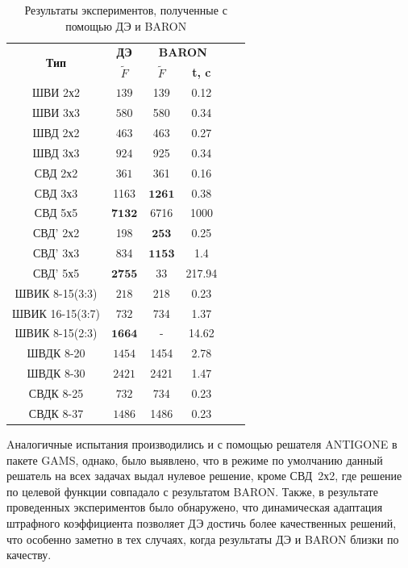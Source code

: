 \begin{table}[!h]

\centering
\caption{ Результаты экспериментов, полученные с помощью ДЭ и BARON}
\begin{tabular}{|c|c|c c|c c|}
    \hline
    \multirow{2}{*}{\textbf{Тип}} & \textbf{ДЭ} & \multicolumn{2}{|c|}{\textbf{BARON}} \\
    & \textbf{$\tilde{F}$} & \textbf{$\tilde{F}$} & \textbf{t, c}  \\
    \hline
    ШВИ 2х2         & ${139}$   & 139    & 0.12      \\
    ШВИ 3х3         & ${580}$   & 580    & 0.34       \\
    ШВД 2х2         & ${463}$   & 463    & 0.27     \\
    ШВД 3х3         & ${924}$   & 925    & 0.34        \\
    СВД 2х2         & ${361}$   & 361    & 0.16         \\
    СВД 3х3        & 1163  & $\mathbf{1261}$   & 0.38     \\
    СВД 5х5         & $\mathbf{7132}$  & 6716   & 1000   \\
    СВД' 2х2       & 198   & $\mathbf{253}$    & 0.25         \\
    СВД' 3х3       & 834   & $\mathbf{1153}$   & 1.4          \\
    СВД' 5х5        & $\mathbf{2755}$  & 33     & 217.94     \\
    ШВИК 8-15(3:3)  & ${218}$   & 218    & 0.23       \\
    ШВИК 16-15(3:7) & ${732}$   & 734    & 1.37     \\
    ШВИК 8-15(2:3)  & $\mathbf{1664}$     & -   & 14.62     \\
    ШВДК 8-20       & ${1454}$  & 1454   & 2.78       \\
    ШВДК 8-30       & ${2421}$  & 2421   & 1.47     \\
    СВДК 8-25       & ${732}$   & 734    & 0.23        \\
    СВДК 8-37       & ${1486}$  & 1486   & 0.23      \\
    \hline
\end{tabular}
\label{tab:results_de}
\end{table}

Aналогичные испытания производились и с помощью решателя ANTIGONE в пакете GAMS, однако, было выявлено, что в режиме по умолчанию данный решатель на всех задачах выдал нулевое решение, кроме СВД~2х2, где решение по целевой функции совпадало с результатом BARON.
Также, в результате проведенных экспериментов было обнаружено, что динамическая адаптация штрафного коэффициента позволяет ДЭ достичь более качественных решений, что особенно заметно в тех случаях, когда результаты ДЭ и BARON близки по качеству.

